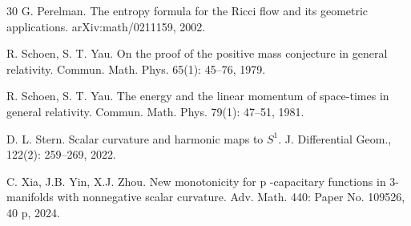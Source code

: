 \documentclass[12pt]{article}
\theoremstyle{definition}
\theoremstyle{plain}
\numberwithin{equation}{section}
\begin{document}
\begin{thebibliography}{30}
 G. Perelman. The entropy formula for the Ricci flow and its geometric applications. arXiv:math/0211159, 2002.

 R. Schoen, S. T. Yau. On the proof of the positive mass conjecture in general relativity. Commun. Math. Phys. 65(1): 45–76, 1979.

 R. Schoen, S. T. Yau. The energy and the linear momentum of space-times in general relativity. Commun. Math. Phys. 79(1): 47–51, 1981.

 D. L. Stern. Scalar curvature and harmonic maps to $S^{1}$. J. Differential Geom., 122(2): 259–269, 2022.

 C. Xia, J.B. Yin, X.J. Zhou. New monotonicity for p
-capacitary functions in 3-manifolds with nonnegative scalar curvature. Adv. Math. 440: Paper No. 109526, 40 p, 2024. 








\end{thebibliography}
\end{document}
